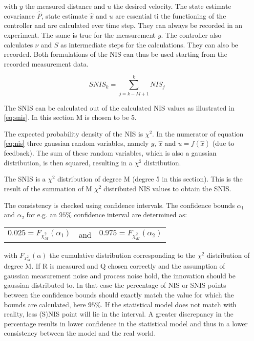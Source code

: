 \documentclass[a4paper]{article}
\newcommand{\newpar}{\vspace{.3cm}\noindent}
\begin{document}
\newpar
with \(y\) the measured distance and \(u\) the desired velocity. The state estimate covariance $\hat{P}$, state estimate $\hat{x}$ and $u$ are essential ti the functioning of the controller and are calculated ever time step. They can always be recorded in an experiment. The same is true for the measurement $y$. The controller also calculates $\nu$ and $S$ as intermediate steps for the calculations. They can also be recorded. Both formulations of the NIS can thus be used starting from the recorded measurement data.

\begin{equation}
    SNIS_{k}=\sum_{j=k-M+1}^{k} NIS_{j}
    \label{eq:snis}
\end{equation}

\newpar
The SNIS can be calculated out of the calculated NIS values as illustrated in \autoref{eq:snis}. In this section M is chosen to be 5.

\newpar
The expected probability density of the NIS is $\chi^2$. In the numerator of equation \autoref{eq:nis} three gaussian random variables, namely $y$, $\hat{x}$ and $u=f(\hat{x})$ (due to feedback). The sum of these random variables, which is also a gaussian distribution, is then squared, resulting in a $\chi^2$ distribution.

\newpar
The SNIS is a $\chi^2$ distribution of degree M (degree 5 in this section). This is the result of the summation of M $\chi^2$ distributed NIS values to obtain the SNIS.

\newpar
The consistency is checked using confidence intervals. The confidence bounds $\alpha_{1}$ and $\alpha_{2}$ for e.g. an $95\%$ confidence interval are determined as:

\begin{center}
    \begin{tabular}{ccc}
        \(0.025 = F_{\chi^2_{M}}(\alpha_{1})\) &   and    & \(0.975 = F_{\chi^2_{M}}(\alpha_{2})\)
    \end{tabular}
\end{center}

\newpar
with \(F_{\chi^2_{M}}(\alpha)\) the cumulative distribution corresponding to the $\chi^2$ distribution of degree M. 
If R is measured and Q chosen correctly and the assumption of gaussian measurement noise and process noise hold, the innovation should be gaussian distributed to. In that case the percentage of NIS or SNIS points between the confidence bounds should exactly match the value for which the bounds are calculated, here $95\%$. If the statistical model does not match with reality, less (S)NIS point will lie in the interval. A greater discrepancy in the percentage results in lower confidence in the statistical model and thus in a lower consistency between the model and the real world.
    
\end{document}

